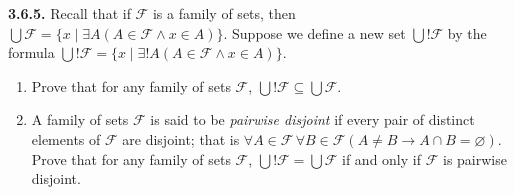 \documentclass[12pt]{amsart}
\newenvironment{statement}[1]{\smallskip\noindent\color[rgb]{.6627, .3529, .6314} {\bf #1.}}{}
\theoremstyle{definition}
\theoremstyle{remark}
\begin{document}
\begin{statement}{3.6.5}
Recall that if $\mathcal{F}$ is a family of sets, then $\bigcup \mathcal{F} = \{ x \mid \exists A (A \in \mathcal{F} \wedge x \in A) \}$.
Suppose we define a new set $\bigcup ! \mathcal{F}$ by the formula $\bigcup ! \mathcal{F} = \{ x \mid \exists ! A (A \in \mathcal{F} \wedge x \in A) \}$.
\begin{enumerate}
	\item Prove that for any family of sets $\mathcal{F}$, $\bigcup ! \mathcal{F} \subseteq
	\bigcup \mathcal{F}$.
	
	\item A family of sets $\mathcal{F}$ is said to be \emph{pairwise disjoint} if every pair of distinct
	elements of $\mathcal{F}$ are disjoint; that is $\forall A \in \mathcal{F} \, \forall B \in \mathcal{F}
	(A \neq B \rightarrow A \cap B = \varnothing)$.
	Prove that for any family of sets $\mathcal{F}$, $\bigcup ! \mathcal{F} = \bigcup \mathcal{F}$
	if and only if $\mathcal{F}$ is pairwise disjoint.
\end{enumerate}
\end{statement}
\end{document}
